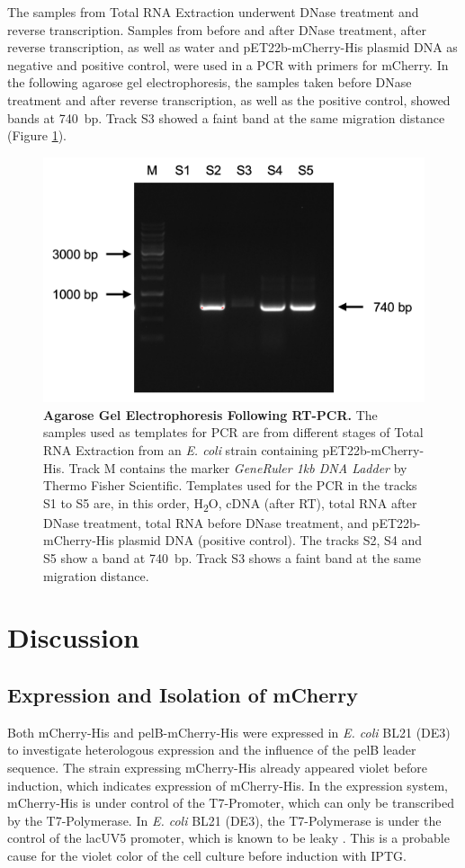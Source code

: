 \documentclass[a4paper,12pt]{article}
\begin{document}
The samples from Total RNA Extraction underwent DNase treatment and reverse transcription. Samples from before and after DNase treatment, after reverse transcription, as well as water and pET22b-mCherry-His plasmid DNA as negative and positive control, were used in a PCR with primers for mCherry. In the following agarose gel electrophoresis, the samples taken before DNase treatment and after reverse transcription, as well as the positive control, showed bands at 740~bp. Track S3 showed a faint band at the same migration distance (Figure \ref{fig:rna2}).

\begin{figure}[h!]
    \centering
    \includegraphics[width=\textwidth]{images/rna_post_pcr.png}
    \caption{\textbf{Agarose Gel Electrophoresis Following RT-PCR.} The samples used as templates for PCR are from different stages of Total RNA Extraction from an \emph{E. coli} strain containing pET22b-mCherry-His. Track M contains the marker \emph{GeneRuler 1kb DNA Ladder} by Thermo Fisher Scientific. Templates used for the PCR in the tracks S1 to S5 are, in this order, H\textsubscript{2}O, cDNA (after RT), total RNA after DNase treatment, total RNA before DNase treatment, and pET22b-mCherry-His plasmid DNA (positive control). The tracks S2, S4 and S5 show a band at 740~bp. Track S3 shows a faint band at the same migration distance.}
    \label{fig:rna2}
\end{figure}
\FloatBarrier
\section{Discussion}
\subsection{Expression and Isolation of mCherry}
Both mCherry-His and pelB-mCherry-His were expressed in \emph{E. coli} BL21 (DE3) to investigate heterologous expression and the influence of the pelB leader sequence. The strain expressing mCherry-His already appeared violet before induction, which indicates expression of mCherry-His. In the expression system, mCherry-His is under control of the T7-Promoter, which can only be transcribed by the T7-Polymerase. In \emph{E. coli} BL21 (DE3), the T7-Polymerase is under the control of the lacUV5 promoter, which is known to be leaky \cite{du2021regulating}. This is a probable cause for the violet color of the cell culture before induction with IPTG. 
\end{document}
